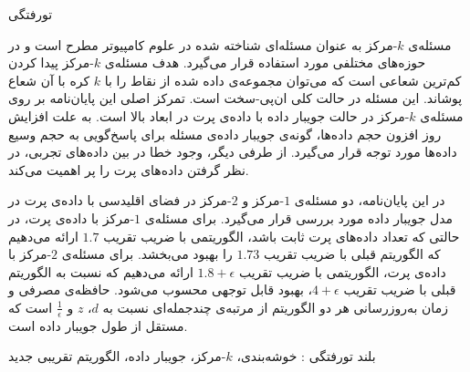 


\pagestyle{empty}

‌تورفتگی

مسئله‌ی $k$-مرکز به عنوان مسئله‌ای شناخته شده در علوم کامپیوتر مطرح است و در حوزه‌های مختلفی مورد استفاده قرار می‌گیرد. هدف مسئله‌ی $k$-مرکز پیدا کردن کم‌ترین شعاعی است که می‌توان مجموعه‌ی داده شده از نقاط را با $k$ کره با آن شعاع پوشاند. این مسئله در حالت کلی ان‌پی-سخت است. تمرکز اصلی این پایان‌نامه بر روی مسئله‌ی $k$-مرکز در حالت جویبار داده با داده‌ی پرت در ابعاد بالا است. به علت افزایش روز افزون حجم داده‌ها، گونه‌ی جویبار داده‌ی مسئله برای پاسخ‌گویی به حجم وسیع داده‌ها مورد توجه قرار می‌گیرد. از طرفی دیگر، وجود خطا در بین داده‌های تجربی، در نظر گرفتن داده‌های پرت را پر اهمیت می‌کند.

در این پایان‌نامه، دو مسئله‌ی $1$-مرکز و $2$-مرکز در فضای اقلیدسی با داده‌ی پرت در مدل جویبار داده مورد بررسی قرار می‌گیرد. برای مسئله‌ی $1$-مرکز با داده‌ی پرت، در حالتی که تعداد داده‌های پرت ثابت باشد، الگوریتمی با ضریب تقریب $1.7$ ارائه می‌دهیم که الگوریتم قبلی با ضریب تقریب $1.73$ را بهبود می‌بخشد. برای مسئله‌ی $2$-مرکز با داده‌ی پرت، الگوریتمی با ضریب تقریب $1.8 + \epsilon$ ارائه می‌دهیم که نسبت به الگوریتم قبلی با ضریب تقریب $4 + \epsilon$، بهبود قابل توجهی محسوب می‌شود. حافظه‌ی مصرفی و زمان به‌روزرسانی هر دو الگوریتم از مرتبه‌ی چندجمله‌ای نسبت به $d$، $z$ و $\frac{1}{\epsilon}$ است که مستقل از طول جویبار داده است.

‌بلند
‌تورفتگی : 
خوشه‌بندی، $k$-مرکز، جویبار داده، الگوریتم تقریبی
‌جدید
